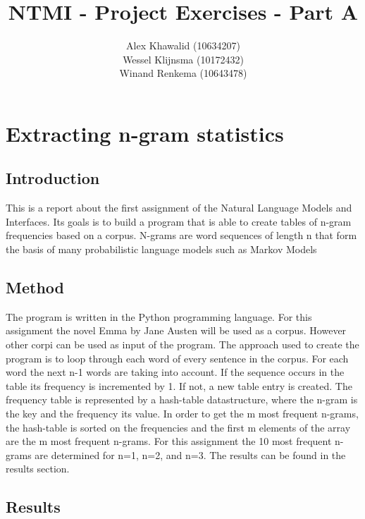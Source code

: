 \documentclass[a4paper, 10pt]{article}
\title{NTMI - Project Exercises - Part A}
\author{Alex Khawalid (10634207)\\
Wessel Klijnsma (10172432)\\
Winand Renkema (10643478)\\
}
\begin{document}
\maketitle

\section{Extracting n-gram statistics}

\subsection{Introduction}
This is a report about the first assignment of the Natural Language Models and Interfaces. Its goals is to build a program that is able to create tables of n-gram frequencies based on a corpus. N-grams are word sequences of length n that form the basis of many probabilistic language models such as Markov Models

\subsection{Method}
The program is written in the Python programming language. For this assignment the novel Emma by Jane Austen will be used as a corpus. However other corpi can be used as input of the program.
The approach used to create the program is to loop through each word of every sentence in the corpus. For each word the next n-1 words are taking into account. If the sequence occurs in the table its frequency is incremented by 1. If not, a new table entry is created.
The frequency table is represented by a hash-table datastructure, where the n-gram is the key and the frequency its value.
In order to get the m most frequent n-grams, the hash-table is sorted on the frequencies and the first m elements of the array are the m most frequent n-grams. For this assignment the 10 most frequent n-grams are determined for n=1, n=2, and n=3. The results can be found in the results section.

\subsection{Results}
\end{document}
